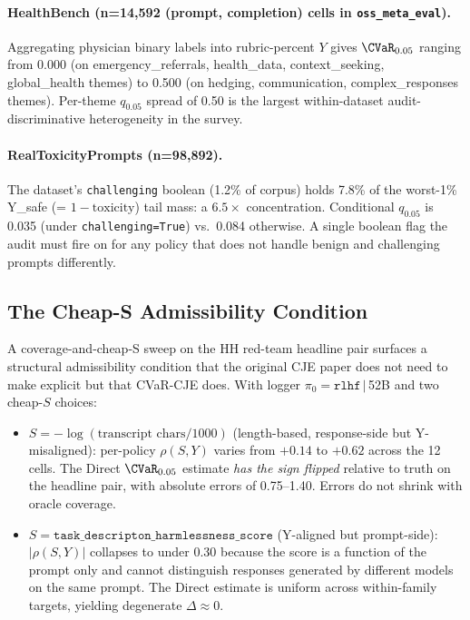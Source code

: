 \paragraph{HealthBench (n=14{,}592 (prompt, completion) cells in
\texttt{oss\_meta\_eval}).} Aggregating physician binary labels into
rubric-percent \(Y\) gives \(\CVaR_{0.05}\) ranging from 0.000 (on
emergency\_referrals, health\_data, context\_seeking, global\_health
themes) to 0.500 (on hedging, communication, complex\_responses
themes). Per-theme \(q_{0.05}\) spread of 0.50 is the largest
within-dataset audit-discriminative heterogeneity in the survey.

\paragraph{RealToxicityPrompts (n=98{,}892).} The dataset's
\texttt{challenging} boolean (1.2\% of corpus) holds 7.8\% of the
worst-1\% Y\_safe (= \(1 - \text{toxicity}\)) tail mass: a
\(6.5\times\) concentration. Conditional \(q_{0.05}\) is 0.035 (under
\texttt{challenging=True}) vs.\ 0.084 otherwise. A single boolean flag
the audit must fire on for any policy that does not handle benign and
challenging prompts differently.

\subsection{The Cheap-S Admissibility Condition}
\label{app:dataset:cheap-s}

A coverage-and-cheap-S sweep on the HH red-team headline pair surfaces
a structural admissibility condition that the original CJE paper does
not need to make explicit but that CVaR-CJE does. With logger
\(\pi_0 = \texttt{rlhf}\,|\,\)52B and two cheap-\(S\) choices:

\begin{itemize}[leftmargin=*,nosep]
\item \(S = -\log(\text{transcript chars} / 1000)\) (length-based,
response-side but Y-misaligned): per-policy \(\rho(S, Y)\) varies
from \(+0.14\) to \(+0.62\) across the 12 cells. The Direct
\(\CVaR_{0.05}\) estimate \emph{has the sign flipped} relative to
truth on the headline pair, with absolute errors of 0.75--1.40.
Errors do not shrink with oracle coverage.
\item \(S = \texttt{task\_descripton\_harmlessness\_score}\) (Y-aligned
but prompt-side): \(|\rho(S, Y)|\) collapses to under 0.30 because
the score is a function of the prompt only and cannot distinguish
responses generated by different models on the same prompt. The
Direct estimate is uniform across within-family targets, yielding
degenerate \(\Delta \approx 0\).
\end{itemize}

